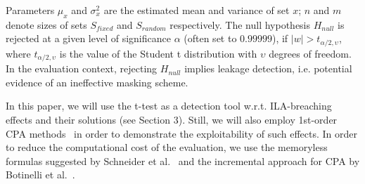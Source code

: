 Parameters $\mu_{x}$ and $\sigma_{x}^2$ are the estimated mean and variance of set $x$; 
$n$ and $m$ denote sizes of sets $S_{fixed}$ and $S_{random}$ respectively. The null hypothesis $H_{null}$ is rejected at a given level of significance $\alpha$ (often set to $0.99999$), if $\lvert w \lvert >  t_{\alpha/2,\upsilon}  $, where $t_{\alpha/2,\upsilon}$ is the value of the Student t distribution with $\upsilon$ degrees of freedom. In the evaluation context, rejecting $H_{null}$ implies leakage detection, i.e. potential evidence of an ineffective masking scheme.

In this paper, we will use the t-test as a detection tool w.r.t. ILA-breaching effects and their solutions (see Section 3). Still, we will also employ 1st-order CPA methods~\cite{DBLP:conf/ches/BrierCO04} in order to demonstrate the exploitability of such effects. In order to reduce the computational cost of the evaluation, we use the memoryless formulas suggested by Schneider et al.~\cite{DBLP:conf/ches/SchneiderM15} and the incremental approach for CPA by Botinelli et al.~\cite{DBLP:journals/iacr/BottinelliB15}.


